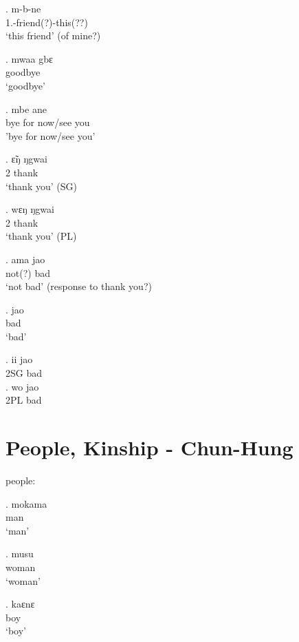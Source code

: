 \documentclass{assets/fieldnotes}
\begin{document}
\exg. m-b-ne\\
1\Sg{}.\Poss{}-friend(?)-this(??)\\
`this friend' (of mine?) 

\exg. mwaa gbɛ\\
goodbye\\
`goodbye' 

\exg. mbe ane\\
bye for now/see you\\
'bye for now/see you' 

\exg. ɛ̃ŋ ŋgwai\\
2 thank\\
`thank you' (SG)

\exg. wɛŋ ŋgwai\\
2 thank\\
`thank you' (PL)

\exg. ama jao\\
not(?) bad\\
`not bad' (response to thank you?)

\exg. jao\\
bad\\
`bad'

\exg. ii jao\\
2SG bad\\

\exg. wo jao\\
2PL bad\\



\section{People, Kinship - Chun-Hung}

people:

\exg. mokama \\
man\\
`man' 

\exg. musu \\
woman\\
`woman'

\exg. kaɛnɛ \\
boy\\
`boy' 
\end{document}
